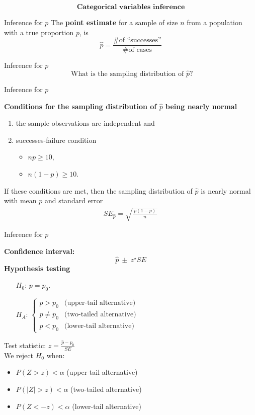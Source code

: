 \documentclass[12pt,a4paper]{beamer}
\begin{document}
\begin{frame}
\[\textbf{Categorical variables inference}\]

\end{frame}
\begin{frame}{Inference for $p$}
		The \textbf{point estimate} for a sample of size $n$ from a population with a true proportion $p$,  is
	\[\hat{p} = \frac{\text{\# of ``successes''}}{\text{\# of cases}} \] 
\end{frame}
\begin{frame}{Inference for $p$}
	\[\text{ What is the sampling distribution of $\hat{p}$?}\]
\end{frame}
\begin{frame}{Inference for $p$}

\begin{framed}
\textbf{Conditions for the sampling distribution of $\hat{p}$ being nearly normal}

	\begin{enumerate}
	\item the sample observations are independent and
	\item successes-failure condition 
	\begin{itemize}
		\item $np\geq10,$
		\item $n(1-p)\geq10$.
	\end{itemize}
	\end{enumerate}
\end{framed}
\begin{framed}
	If these conditions are met, then the sampling distribution of $\hat{p}$ is nearly normal with mean $p$ and standard error
	\begin{eqnarray*}
	SE_{\hat{p}} = \sqrt{\frac{\ p(1-p)\ }{n}}
	\end{eqnarray*}
\end{framed}
\end{frame}
\begin{frame}{Inference for $p$}
	
\textbf{Confidence interval:}
	\[\hat{p} \ \pm\  z^{\star}SE\]
\textbf{Hypothesis testing}
		\small\begin{itemize}
		\setlength{\itemsep}{0mm}
		\item[$H_0$:] $p= p_0$.
		\item[$H_A$:]$\left\{
		\begin{array}{ll}
			p>p_0& \text{(upper-tail alternative)}\\
			p\neq p_0& \text{(two-tailed alternative)}\\
			p< p_0& \text{(lower-tail alternative)}
		\end{array}
		\right.$
	\end{itemize}
	Test statistic: $z=\frac{\hat{p}-p_0}{SE}$\\
	We reject $H_0$ when:
	\small\begin{itemize}
		\item $P(Z>z)<\alpha$ (upper-tail alternative)
		\item $P(|Z|>z)<\alpha$ (two-tailed alternative)
		\item $P(Z<-z)<\alpha$ (lower-tail alternative)
\end{itemize}

\end{frame}
\end{document}
